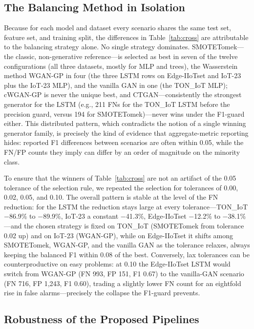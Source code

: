﻿\documentclass[journal]{IEEEtran}
\begin{document}
\subsection{The Balancing Method in Isolation}
Because for each model and dataset every scenario shares the same test set, feature set, and training split, the differences in Table~\ref{tab:cross} are attributable to the balancing strategy alone. No single strategy dominates. SMOTETomek---the classic, non-generative reference---is selected as best in seven of the twelve configurations (all three datasets, mostly for MLP and trees), the Wasserstein method WGAN-GP in four (the three LSTM rows on Edge-IIoTset and IoT-23 plus the IoT-23 MLP), and the vanilla GAN in one (the TON\_IoT MLP); cWGAN-GP is never the unique best, and CTGAN---consistently the strongest generator for the LSTM (e.g., 211 FNs for the TON\_IoT LSTM before the precision guard, versus 194 for SMOTETomek)---never wins under the F1-guard either. This distributed pattern, which contradicts the notion of a single winning generator family, is precisely the kind of evidence that aggregate-metric reporting hides: reported F1 differences between scenarios are often within 0.05, while the FN/FP counts they imply can differ by an order of magnitude on the minority class.

To ensure that the winners of Table~\ref{tab:cross} are not an artifact of the 0.05 tolerance of the selection rule, we repeated the selection for tolerances of 0.00, 0.02, 0.05, and 0.10. The overall pattern is stable at the level of the FN reduction: for the LSTM the reduction stays large at every tolerance---TON\_IoT $-$86.9\% to $-$89.9\%, IoT-23 a constant $-$41.3\%, Edge-IIoTset $-$12.2\% to $-$38.1\%---and the chosen strategy is fixed on TON\_IoT (SMOTETomek from tolerance 0.02 up) and on IoT-23 (WGAN-GP), while on Edge-IIoTset it shifts among SMOTETomek, WGAN-GP, and the vanilla GAN as the tolerance relaxes, always keeping the balanced F1 within 0.08 of the best. Conversely, lax tolerances can be counterproductive on easy problems: at 0.10 the Edge-IIoTset LSTM would switch from WGAN-GP (FN 993, FP 151, F1 0.67) to the vanilla-GAN scenario (FN 716, FP 1{,}243, F1 0.60), trading a slightly lower FN count for an eightfold rise in false alarms---precisely the collapse the F1-guard prevents.

\subsection{Robustness of the Proposed Pipelines}
\label{subsec:robust}
\end{document}

